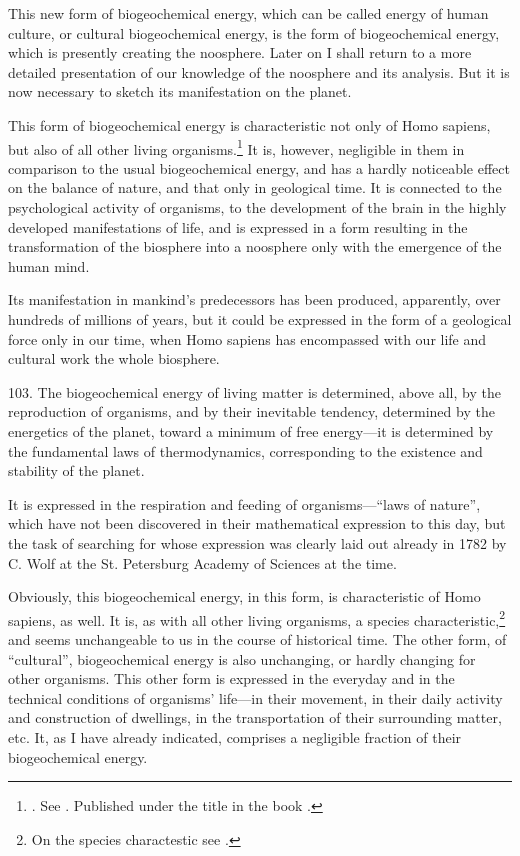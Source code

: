This new form of biogeochemical energy, which can be called energy of human
culture, or cultural biogeochemical energy, is the form of biogeochemical
energy, which is presently creating the noosphere.  Later on I shall return to
a more detailed presentation of our knowledge of the noosphere and its
analysis.  But it is now necessary to sketch its manifestation on the planet.

This form of biogeochemical energy is characteristic not only of Homo sapiens,
but also of all other living
organisms.\footnote{
	\foreignlanguage{russian}{\cite{vernadsky1926biosfera-p30-48}}.  See
	\foreignlanguage{russian}{\cite{vernadsky1994zhivoe-p330-341,
	vernadsky1926razmnozhenii1, vernadsky1926razmnozhenii2}}.  Published
	under the title \foreignlanguage{russian}{} in the book
	\foreignlanguage{russian}{\cite{vernadsky1992trudy-p75-101}}.
}  It is, however, negligible in them in comparison to the usual biogeochemical
energy, and has a hardly noticeable effect on the balance of nature, and that
only in geological time.  It is connected to the psychological activity of
organisms, to the development of the brain in the highly developed
manifestations of life, and is expressed in a form resulting in the
transformation of the biosphere into a noosphere only with the emergence of the
human mind.

Its manifestation in mankind's predecessors has been produced, apparently,
over hundreds of millions of years, but it could be expressed in the form of a
geological force only in our time, when Homo sapiens has encompassed with our
life and cultural work the whole biosphere.


103. The biogeochemical energy of living matter is determined, above all, by
the reproduction of organisms, and by their inevitable tendency, determined by
the energetics of the planet, toward a minimum of free energy---it is
determined by the fundamental laws of thermodynamics, corresponding to the
existence and stability of the planet.

It is expressed in the respiration and feeding of organisms---``laws of
nature'', which have not been discovered in their mathematical expression to
this day, but the task of searching for whose expression was clearly laid out
already in 1782 by C. Wolf at the St. Petersburg Academy of
Sciences at the time.

Obviously, this biogeochemical energy, in this form, is characteristic of Homo
sapiens, as well.  It is, as with all other living organisms, a species
characteristic,\footnote{
	On the species charactestic see \cite{vernadsky1930considerations}.
} and seems unchangeable to us in the course of historical time.  The other
form, of ``cultural'', biogeochemical energy is also unchanging, or hardly
changing for other organisms.  This other form is expressed in the everyday and
in the technical conditions of organisms' life---in their movement, in their
daily activity and construction of dwellings, in the transportation of their
surrounding matter, etc.  It, as I have already indicated, comprises a
negligible fraction of their biogeochemical energy.

